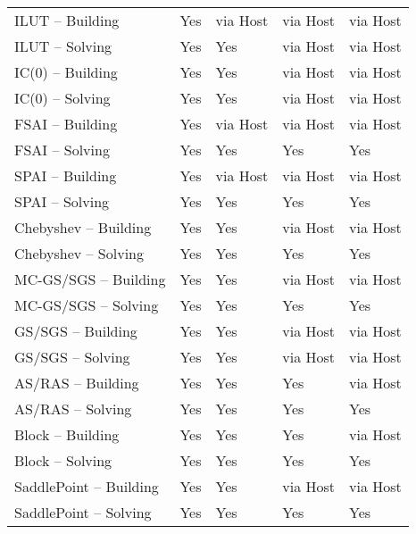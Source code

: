 \begin{table}[H]
\begin{tabular}{l|l|l|l|l}
ILUT -- Building   & Yes    & via Host   & via Host     & \multicolumn{1}{l|}{via Host} \\
ILUT -- Solving    & Yes    & Yes   & via Host     & \multicolumn{1}{l|}{via Host} \\ \hline

IC($0$) -- Building   & Yes    & Yes   & via Host     & \multicolumn{1}{l|}{via Host} \\
IC($0$) -- Solving    & Yes    & Yes   & via Host     & \multicolumn{1}{l|}{via Host} \\ \hline

FSAI -- Building   & Yes    & via Host   & via Host     & \multicolumn{1}{l|}{via Host} \\
FSAI -- Solving    & Yes    & Yes   & Yes     & \multicolumn{1}{l|}{Yes} \\ \hline

SPAI -- Building   & Yes    & via Host   & via Host     & \multicolumn{1}{l|}{via Host} \\
SPAI -- Solving    & Yes    & Yes   & Yes     & \multicolumn{1}{l|}{Yes} \\ \hline

Chebyshev -- Building   & Yes    & Yes   & via Host     & \multicolumn{1}{l|}{via Host} \\
Chebyshev -- Solving    & Yes    & Yes   & Yes     & \multicolumn{1}{l|}{Yes} \\ \hline

MC-GS/SGS -- Building   & Yes    & Yes   & via Host     & \multicolumn{1}{l|}{via Host} \\
MC-GS/SGS -- Solving    & Yes    & Yes   & Yes     & \multicolumn{1}{l|}{Yes} \\ \hline

GS/SGS -- Building   & Yes    & Yes   & via Host     & \multicolumn{1}{l|}{via Host} \\
GS/SGS -- Solving    & Yes    & Yes   & via Host     & \multicolumn{1}{l|}{via Host} \\ \hline

AS/RAS -- Building   & Yes    & Yes   & Yes     & \multicolumn{1}{l|}{via Host} \\
AS/RAS -- Solving    & Yes    & Yes   & Yes     & \multicolumn{1}{l|}{Yes} \\ \hline

Block -- Building   & Yes    & Yes   & Yes     & \multicolumn{1}{l|}{via Host} \\
Block -- Solving    & Yes    & Yes   & Yes     & \multicolumn{1}{l|}{Yes} \\ \hline

SaddlePoint -- Building   & Yes    & Yes   & via Host     & \multicolumn{1}{l|}{via Host} \\
SaddlePoint -- Solving    & Yes    & Yes   & Yes     & \multicolumn{1}{l|}{Yes} \\ \hline


\end{tabular}
\end{table}


